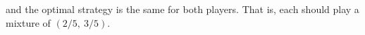 \begin{enumerate}
\begin{solution}
and the optimal strategy is the same for both players. That is, each
should play a mixture of $(2/5,~3/5)$.

\end{solution}

\end{enumerate}
